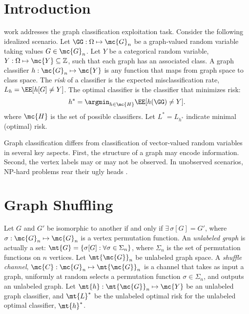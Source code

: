 \documentclass[10pt,journal,cspaper,compsoc]{IEEEtran}
\begin{document}
\maketitle
\IEEEdisplaynotcompsoctitleabstractindextext
\IEEEpeerreviewmaketitle



\section{Introduction}

  work addresses the graph classification exploitation task.  Consider the following idealized scenario. Let $\GG: \Omega \mapsto \mc{G}_n$ be a graph-valued random variable taking values $G\in \mc{G}_n$. 
Let $Y$ be a categorical random variable, $Y: \Omega \mapsto \mc{Y} \subseteq \mathbb{Z}$, such that each graph has an associated class.  A graph classifier $h: \mc{G}_n \mapsto \mc{Y}$ is any function that maps from graph space to class space.  The \emph{risk} of a classifier is the expected misclassification rate, $L_h=\EE[h[G]\neq Y]$.  The optimal classifier is the classifier that minimizes risk:
\begin{align}
	h^* = \argmin_{h \in \mc{H}} \EE[h(\GG) \neq Y].
\end{align}
where $\mc{H}$ is the set of possible classifiers.  Let $L^*=L_{h^*}$ indicate minimal (optimal) risk.  

Graph classification differs from classification of vector-valued random variables in several key aspects.  First, the structure of a graph may encode information.  Second, the vertex labels may or may not be observed.  In unobserved scenarios, NP-hard problems rear their ugly heads \cite{Conte04}.

\section{Graph Shuffling} %
\label{sec:graph_shuffling}


Let $G$ and $G'$ be isomorphic to another if and only if $\exists \, \sigma[G]=G'$, where  $\sigma: \mc{G}_n \mapsto \mc{G}_n$ is a vertex permutation function.   An \emph{unlabeled graph} is actually a set: $\mt{G}=\{\sigma[G]: \forall \sigma \in \Sigma_n\}$, where $\Sigma_n$ is the set of permutation functions on $n$ vertices. Let $\mt{\mc{G}}_n$ be unlabeled graph space. A \emph{shuffle channel}, $\mc{C}: \mc{G}_n \mapsto \mt{\mc{G}}_n$ is a channel that takes as input a graph, uniformly at random selects a permutation function $\sigma \in \Sigma_n$, and outputs an unlabeled graph.  Let $\mt{h}: \mt{\mc{G}}_n \mapsto \mc{Y}$ be an unlabeled graph classifier, and $\mt{L}^*$ be the unlabeled optimal risk for the unlabeled optimal classifier, $\mt{h}^*$. %
\end{document}
